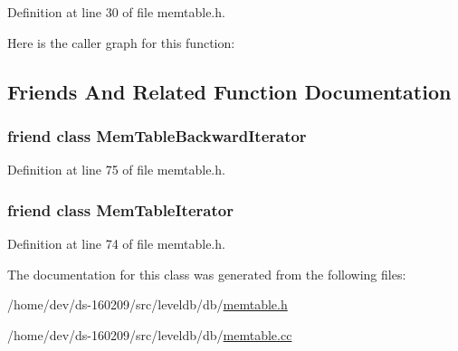 Definition at line 30 of file memtable.\+h.



Here is the caller graph for this function\+:




\subsection{Friends And Related Function Documentation}
\hypertarget{classleveldb_1_1_mem_table_ab6427243fb396d56604898725f9f2327}{}
\subsubsection[{Mem\+Table\+Backward\+Iterator}]{\setlength{\rightskip}{0pt plus 5cm}friend class Mem\+Table\+Backward\+Iterator\hspace{0.3cm}{\ttfamily [friend]}}\label{classleveldb_1_1_mem_table_ab6427243fb396d56604898725f9f2327}


Definition at line 75 of file memtable.\+h.

\hypertarget{classleveldb_1_1_mem_table_ad6cb602bccb9af617c8cb348ae693d4a}{}
\subsubsection[{Mem\+Table\+Iterator}]{\setlength{\rightskip}{0pt plus 5cm}friend class {\bf Mem\+Table\+Iterator}\hspace{0.3cm}{\ttfamily [friend]}}\label{classleveldb_1_1_mem_table_ad6cb602bccb9af617c8cb348ae693d4a}


Definition at line 74 of file memtable.\+h.



The documentation for this class was generated from the following files\+:\begin{DoxyCompactItemize}
\item 
/home/dev/ds-\/160209/src/leveldb/db/\hyperlink{memtable_8h}{memtable.\+h}\item 
/home/dev/ds-\/160209/src/leveldb/db/\hyperlink{memtable_8cc}{memtable.\+cc}\end{DoxyCompactItemize}
